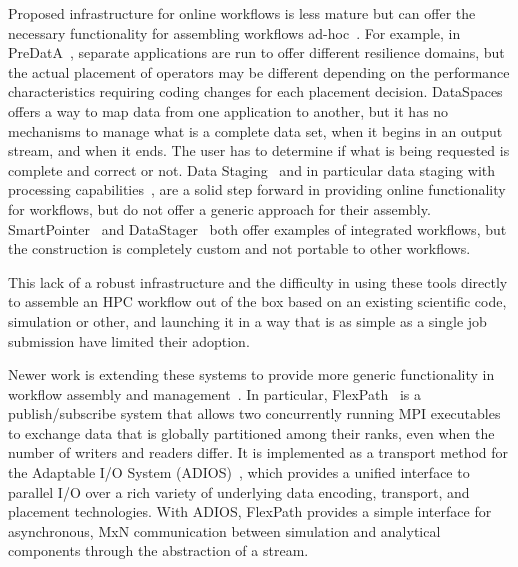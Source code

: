 
Proposed infrastructure for online workflows is less mature but can offer
the necessary functionality for assembling workflows
ad-hoc~\cite{zheng:2010:predata,docan:2010:dataspaces,wolf:2002:smartpointer,abbasi:2009:datastager}.
For example, in PreDatA~\cite{zheng:2010:predata}, separate applications are
run to offer different resilience domains, but the actual placement of
operators may be different depending on the performance characteristics requiring
coding changes for each placement decision.
DataSpaces~\cite{docan:2010:dataspaces} offers a way to map data from one
application to another, but it has no mechanisms to manage what is a complete
data set, when it begins in an output stream, and when it ends. The user has to
determine if what is being requested is complete and correct or not.
Data Staging~\cite{nisar:2008:staging} and in particular
data staging with processing
capabilities~\cite{abbasi:2009:datastager,ober:seismic}, are a solid step
forward in providing online functionality for workflows, but do not 
offer a generic approach for their assembly.
SmartPointer~\cite{wolf:2002:smartpointer} and
DataStager~\cite{abbasi:2009:datastager} both offer examples of integrated
workflows, but the construction is completely custom and not portable to other
workflows.


This lack of a robust infrastructure and the difficulty in
using these tools directly to assemble an
HPC workflow out of the box
based on an existing scientific code,
simulation or other,
and launching it in a way that is
as simple as a single job submission
have limited their adoption.

Newer work is extending these
systems to provide more generic functionality
in workflow assembly and
management~\cite{dayal:2014:flexpath,dayal:2015:escience,lofstead:2012:txn,lofstead:2013:txn-pdsw,lofstead:2012:txn-metadata,lofstead:2014:txn,lofstead:2016:superglue}.
In particular, FlexPath~\cite{dayal:2014:flexpath}
is a publish/subscribe system that allows
two concurrently running MPI executables to
exchange data that is globally partitioned among
their ranks, even when the number of writers and readers differ.
It is implemented as a transport method for the
Adaptable I/O System (ADIOS)~\cite{lofstead:2009:adaptable},
which provides a unified interface to parallel I/O over a rich
variety of underlying data encoding, transport, and placement technologies.
With ADIOS, FlexPath provides a simple interface for
asynchronous, MxN communication
between simulation and analytical components
through the abstraction of a stream.

